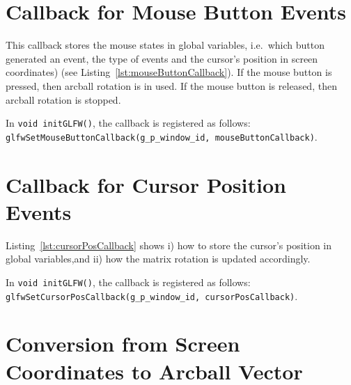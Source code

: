 \documentclass[11pt,oneside,a4paper,final]{article}
\begin{document}
\section{Callback for Mouse Button Events}
\label{mouseButtonCallback}

This callback stores the mouse states in global variables, i.e.~which button generated an event, the type of events and the cursor's position in screen coordinates) (see Listing~\ref{lst:mouseButtonCallback}).
If the mouse button is pressed, then arcball rotation is in used. 
If the mouse button is released, then arcball rotation is stopped.

In \verb+void initGLFW()+, the callback is registered as follows:
\verb+glfwSetMouseButtonCallback(g_p_window_id, mouseButtonCallback)+.


\begin{center}

\end{center}


\section{Callback for Cursor Position Events}
\label{cursorPosCallback}

Listing~\ref{lst:cursorPosCallback} shows i) how to store the cursor's position in global variables,and ii) 
how the matrix rotation is updated accordingly.

In \verb+void initGLFW()+, the callback is registered as follows:
\verb+glfwSetCursorPosCallback(g_p_window_id, cursorPosCallback)+.

\begin{center}

\end{center}


\section{Conversion from Screen Coordinates to Arcball Vector}
\label{getArcballVector}
\end{document}
